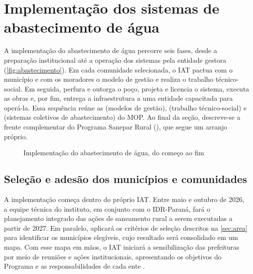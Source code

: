 \section{Implementação dos sistemas de abastecimento de água}
\label{sec:abastecimento}

A implementação do abastecimento de água percorre seis fases, desde a
preparação institucional até a operação dos sistemas pela entidade gestora
(\autoref{fig:abastecimento}). Em cada comunidade selecionada, o IAT
pactua com o município e com os moradores o modelo de gestão e realiza o
trabalho técnico-social. Em seguida, perfura e outorga o poço, projeta e
licencia o sistema, executa as obras e, por fim, entrega a infraestrutura a
uma entidade capacitada para operá-la. Essa sequência reúne as
 (modelos de gestão),  (trabalho
técnico-social) e  (sistemas coletivos de abastecimento)
do MOP. Ao final da seção, descreve-se a frente complementar do Programa
Sanepar Rural (), que segue um arranjo próprio.

\begin{figure}[htbp]
  \centering
  \caption{Implementação do abastecimento de água, do começo ao fim}
  \label{fig:abastecimento}
\end{figure}

\subsection{Seleção e adesão dos municípios e comunidades}
\label{subsec:adesao}

A implementação começa dentro do próprio IAT. Entre maio e outubro de 2026,
a equipe técnica do instituto, em conjunto com o IDR-Paraná, fará o
planejamento integrado das ações de saneamento rural a serem executadas a
partir de 2027. Em paralelo, aplicará os critérios de seleção descritos na
\autoref{sec:area} para identificar os municípios elegíveis, cujo resultado
será consolidado em um mapa. Com esse mapa em mãos, o IAT iniciará a
sensibilização das prefeituras por meio de reuniões e ações institucionais,
apresentando os objetivos do Programa e as responsabilidades de cada ente
\cite{mop2026}.

